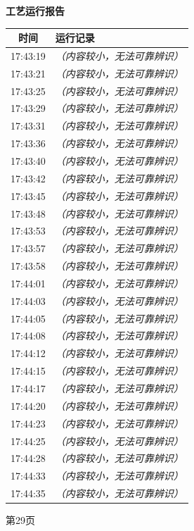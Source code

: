 \documentclass[UTF8,10pt,a4paper,fontset=fandol]{ctexart}
\begin{document}
\noindent
\begin{minipage}[t]{0.47\textwidth}
\centering
\textbf{工艺运行报告}

\vspace{2pt}
\begin{tabularx}{\linewidth}{|c|X|}
\hline
\textbf{时间} & \textbf{运行记录}\\ \hline
17:43:19 & \textit{（内容较小，无法可靠辨识）}\\ \hline
17:43:21 & \textit{（内容较小，无法可靠辨识）}\\ \hline
17:43:25 & \textit{（内容较小，无法可靠辨识）}\\ \hline
17:43:29 & \textit{（内容较小，无法可靠辨识）}\\ \hline
17:43:31 & \textit{（内容较小，无法可靠辨识）}\\ \hline
17:43:36 & \textit{（内容较小，无法可靠辨识）}\\ \hline
17:43:40 & \textit{（内容较小，无法可靠辨识）}\\ \hline
17:43:42 & \textit{（内容较小，无法可靠辨识）}\\ \hline
17:43:45 & \textit{（内容较小，无法可靠辨识）}\\ \hline
17:43:48 & \textit{（内容较小，无法可靠辨识）}\\ \hline
17:43:53 & \textit{（内容较小，无法可靠辨识）}\\ \hline
17:43:57 & \textit{（内容较小，无法可靠辨识）}\\ \hline
17:43:58 & \textit{（内容较小，无法可靠辨识）}\\ \hline
17:44:01 & \textit{（内容较小，无法可靠辨识）}\\ \hline
17:44:03 & \textit{（内容较小，无法可靠辨识）}\\ \hline
17:44:05 & \textit{（内容较小，无法可靠辨识）}\\ \hline
17:44:08 & \textit{（内容较小，无法可靠辨识）}\\ \hline
17:44:12 & \textit{（内容较小，无法可靠辨识）}\\ \hline
17:44:15 & \textit{（内容较小，无法可靠辨识）}\\ \hline
17:44:17 & \textit{（内容较小，无法可靠辨识）}\\ \hline
17:44:20 & \textit{（内容较小，无法可靠辨识）}\\ \hline
17:44:23 & \textit{（内容较小，无法可靠辨识）}\\ \hline
17:44:25 & \textit{（内容较小，无法可靠辨识）}\\ \hline
17:44:28 & \textit{（内容较小，无法可靠辨识）}\\ \hline
17:44:33 & \textit{（内容较小，无法可靠辨识）}\\ \hline
17:44:35 & \textit{（内容较小，无法可靠辨识）}\\ \hline
\end{tabularx}

\vspace{4pt}
{\scriptsize 第29页}
\end{minipage}
\end{document}
